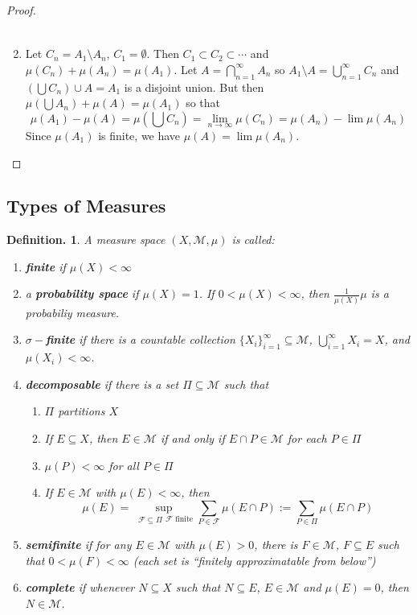 \documentclass[11pt, a4paper]{memoir}
\theoremstyle{change}
\theoremstyle{plain}
\theoremstyle{nonumberplain}
\newtheorem{definition}{Definition.}
\newtheorem{proof}{Proof}
\begin{document}
\begin{proof}
\begin{enumerate}
\begin{align*}
            \end{align*}
        \item Let $C_n=A_1\setminus A_n$, $C_1=\emptyset$.
            Then $C_1\subset C_2\subset\cdots$ and $\mu(C_n)+\mu(A_n)=\mu(A_1)$.
            Let $A=\bigcap\limits_{n=1}^\infty A_n$ so $A_1\setminus A=\bigcup\limits_{n=1}^\infty C_n$ and $(\bigcup C_n)\cup A=A_1$ is a disjoint union.
            But then $\mu(\bigcup A_n)+\mu(A)=\mu(A_1)$ so that
            \begin{equation*}\mu(A_1)-\mu(A)=\mu(\bigcup C_n)=\lim_{n\to\infty}\mu(C_n)=\mu(A_n)-\lim \mu(A_n)\end{equation*}
            Since $\mu(A_1)$ is finite, we have $\mu(A)=\lim\mu(A_n)$.
    \end{enumerate}
\end{proof}
\subsection{Types of Measures}
\begin{definition}
    A measure space $(X,\mathcal{M},\mu)$ is called:
    \begin{enumerate}[nolistsep]
        \item \textbf{finite} if $\mu(X)<\infty$
        \item a \textbf{probability space} if $\mu(X)=1$.
            If $0<\mu(X)<\infty$, then $\frac{1}{\mu(X)}\mu$ is a probabiliy measure.
        \item \textbf{$\sigma-$finite} if there is a countable collection $\{X_i\}_{i=1}^\infty\subseteq\mathcal{M}$, $\bigcup_{i=1}^\infty X_i=X$, and $\mu(X_i)<\infty$.
        \item \textbf{decomposable} if there is a set $\Pi\subseteq\mathcal{M}$ such that
            \begin{enumerate}[nolistsep]
                \item $\Pi$ partitions $X$
                \item If $E\subseteq X$, then $E\in\mathcal{M}$ if and only if $E\cap P\in\mathcal{M}$ for each $P\in\Pi$
                \item $\mu(P)<\infty$ for all $P\in\Pi$
                \item If $E\in\mathcal{M}$ with $\mu(E)<\infty$, then
                    \begin{equation*}
                        \mu(E)=\sup_{\substack{\mathcal{F}\subseteq\Pi}{\mathcal{F} \text{ finite}}}\sum\limits_{P\in\mathcal{F}}\mu(E\cap P):=\sum\limits_{P\in\Pi}\mu(E\cap P)
                    \end{equation*}
            \end{enumerate}
        \item \textbf{semifinite} if for any $E\in\mathcal{M}$ with $\mu(E)>0$, there is $F\in\mathcal{M}$, $F\subseteq E$ such that $0<\mu(F)<\infty$ (each set is ``finitely approximatable from below'')
        \item \textbf{complete} if whenever $N\subseteq X$ such that $N\subseteq E$, $E\in\mathcal{M}$ and $\mu(E)=0$, then $N\in\mathcal{M}$.
    \end{enumerate}
\end{definition}
\end{document}
